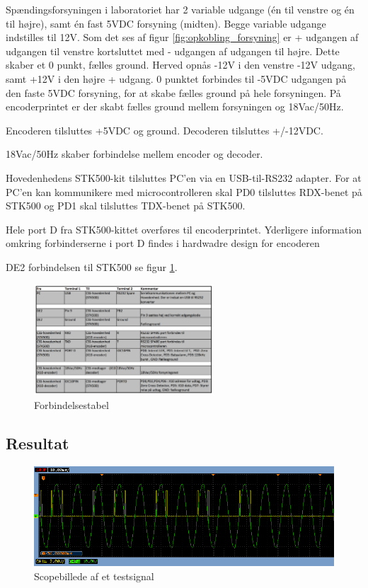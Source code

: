 Spændingsforsyningen i laboratoriet har 2 variable udgange (én til venstre og én til højre), samt én fast 5VDC forsyning (midten). Begge variable udgange indstilles til 12V. 
Som det ses af figur \ref{fig:opkobling_forsyning} er + udgangen af udgangen til venstre kortsluttet med - udgangen af udgangen til højre. Dette skaber et 0 punkt, fælles ground. Herved opnås -12V i den venstre -12V udgang, samt +12V i den højre + udgang. 0 punktet forbindes til -5VDC udgangen på den faste 5VDC forsyning, for at skabe fælles ground på hele forsyningen. På encoderprintet er der skabt fælles ground mellem forsyningen og 18Vac/50Hz.

Encoderen tilsluttes +5VDC og ground.
Decoderen tilsluttes +/-12VDC.

18Vac/50Hz skaber forbindelse mellem encoder og decoder.

Hovedenhedens STK500-kit tilsluttes PC'en via en USB-til-RS232 adapter. For at PC'en kan kommunikere med microcontrolleren skal PD0 tilsluttes RDX-benet på STK500 og PD1 skal tilsluttes TDX-benet på STK500. 

Hele port D fra STK500-kittet overføres til encoderprintet. Yderligere information omkring forbinderserne i port D findes i hardwadre design for encoderen

DE2 forbindelsen til STK500 se figur \ref{fig:integration_tabel}.

\begin{figure}[H]
	\centering
	\includegraphics[width=0.6\textwidth]{billeder/IntTest/Integration_tabel}
	\caption{Forbindelsestabel}
	\label{fig:integration_tabel}
\end{figure}

\subsection{Resultat}

\begin{figure}[H]
	\centering
	\includegraphics[width=\textwidth]{billeder/IntTest/Modtager_0101_ON}
	\caption{Scopebillede af et testsignal}
	\label{fig:Modtager_0101_ON}
\end{figure}

